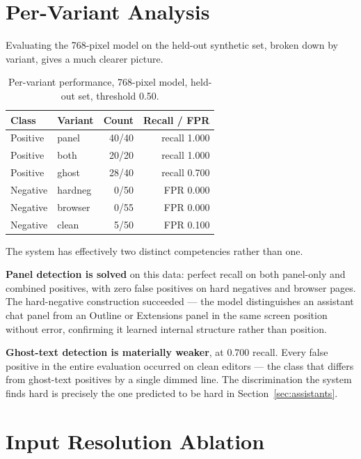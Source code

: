 \documentclass[12pt,oneside]{report}
\begin{document}
\section{Per-Variant Analysis}
\label{sec:variant}

Evaluating the 768-pixel model on the held-out synthetic set, broken down by
variant, gives a much clearer picture.

\begin{table}[h]
\centering
\caption{Per-variant performance, 768-pixel model, held-out set, threshold 0.50.}
\begin{tabular}{@{}llrr@{}}
\toprule
\textbf{Class} & \textbf{Variant} & \textbf{Count} & \textbf{Recall / FPR} \\
\midrule
Positive & panel & 40/40 & recall 1.000 \\
Positive & both & 20/20 & recall 1.000 \\
Positive & ghost & 28/40 & recall 0.700 \\
\midrule
Negative & hardneg & 0/50 & FPR 0.000 \\
Negative & browser & 0/55 & FPR 0.000 \\
Negative & clean & 5/50 & FPR 0.100 \\
\bottomrule
\end{tabular}
\end{table}

The system has effectively two distinct competencies rather than one.

\textbf{Panel detection is solved} on this data: perfect recall on both
panel-only and combined positives, with zero false positives on hard negatives
and browser pages. The hard-negative construction succeeded --- the model
distinguishes an assistant chat panel from an Outline or Extensions panel in
the same screen position without error, confirming it learned internal
structure rather than position.

\textbf{Ghost-text detection is materially weaker}, at 0.700 recall. Every
false positive in the entire evaluation occurred on clean editors --- the class
that differs from ghost-text positives by a single dimmed line. The
discrimination the system finds hard is precisely the one predicted to be hard
in Section~\ref{sec:assistants}.

\section{Input Resolution Ablation}
\label{sec:ablation}
\end{document}
